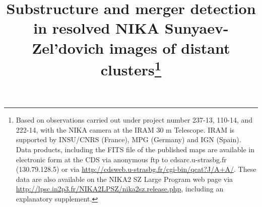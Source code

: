\documentclass[traditabstract]{aa}
\begin{document}
\title{Substructure and merger detection in resolved NIKA Sunyaev-Zel'dovich images of distant clusters\thanks{Based on observations carried out under project number 237-13, 110-14, and 222-14, with the NIKA camera at the IRAM 30 m Telescope. IRAM is supported by INSU/CNRS (France), MPG (Germany) and IGN (Spain). Data products, including the FITS file of the published maps are available in electronic form at the CDS via anonymous ftp to cdsarc.u-strasbg.fr (130.79.128.5) or via \url{http://cdsweb.u-strasbg.fr/cgi-bin/qcat?J/A+A/}. These data are also available on the NIKA2 SZ Large Program web page via \url{http://lpsc.in2p3.fr/NIKA2LPSZ/nika2sz.release.php}, including an explanatory supplement.}}


\end{document}
